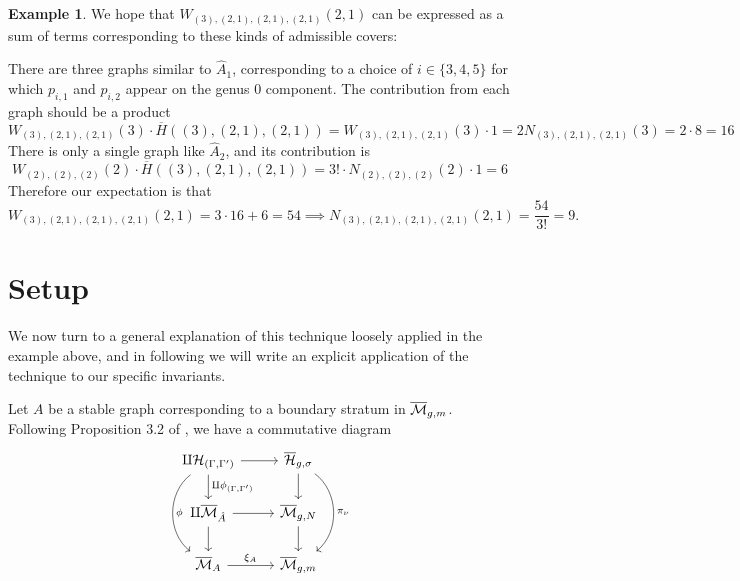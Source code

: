 \documentclass[thesis]{thesis-umich}           %
\newcommand{\Hb}{\overline{\mathcal H}}
\theoremstyle{definition}
\newtheorem{eg}[thm]{Example}
\begin{document}
\begin{eg}

                                    We hope that $W_{(3),(2,1),(2,1),(2,1)}(2,1)$ can be expressed
                                    as a sum of terms corresponding to these kinds of
                                    admissible covers:

                                    There are three graphs similar to $\hat A_1$, corresponding to a choice of $i\in\{3,4,5\}$ for which $p_{i,1}$ and $p_{i,2}$ appear on the genus $0$ component. The contribution from each graph should be a product
                                    \[
                                    W_{(3),(2,1),(2,1)}(3)\cdot \overline H((3),(2,1),(2,1))=W_{(3),(2,1),(2,1)}(3)\cdot 1=2N_{(3),(2,1),(2,1)}(3)=2\cdot 8=16
                                    \]
                                    There is only a single graph like $\hat A_2$,
                                    and its contribution is
                                    \[
                                    W_{(2),(2),(2)}(2)\cdot \overline H((3),(2,1),(2,1))=3!\cdot N_{(2),(2),(2)}(2)\cdot 1=6
                                    \]
                                    Therefore our expectation is that
                                    \[
                                    W_{(3),(2,1),(2,1),(2,1)}(2,1)=3\cdot 16+6=54\implies N_{(3),(2,1),(2,1),(2,1)}(2,1)=\frac{54}{3!}=9.
                                    \]
  \end{eg}

                \section{Setup}

                We now turn to a general explanation of this technique loosely applied in the example above, and in following \cite{Generalized} we will write an explicit application of the technique to our specific invariants.
                


Let $A$ be a stable graph
corresponding to a boundary stratum in $\overline{\mathcal M}_{g,m}$.
Following Proposition 3.2 of \cite{Lian}, we have a commutative diagram
\[\begin{tikzcd}
\amalg \mathcal H_{(\Gamma,\Gamma')} & \Hb_{g,\sigma} \\
\amalg \mb_{\hat A} & \mb_{g,N} \\
	\mb_A & \mb_{g,m}
	\arrow[from=1-1, to=1-2]
	\arrow[from=1-1, to=2-1, "\amalg \phi_{(\Gamma,\Gamma')}"]
        \arrow[from=2-1, to=3-1]
	\arrow[from=1-2, to=2-2]
	\arrow[from=2-1, to=2-2]
        \arrow[from=2-2, to=3-2]
        \arrow[from=3-1, to=3-2, "\xi_A"]
        \arrow[from=1-2, to=3-2, bend left=52, "\pi_{\nu}"]
        \arrow[from=1-1, to=3-1, bend  right=52, "\phi"]
\end{tikzcd}\]
\end{document}
